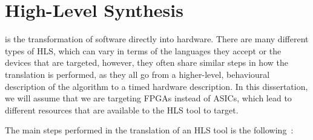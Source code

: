 \section{High-Level Synthesis}%
\label{sec:bg:hls}

 is the transformation of software directly into hardware.
There are many different types of \gls{HLS}, which can vary in terms of the
languages they accept or the devices that are targeted, however, they often
share similar steps in how the translation is performed, as they all go from a
higher-level, behavioural description of the algorithm to a timed hardware
description.  In this dissertation, we will assume that we are targeting
\glspl{FPGA} instead of \glspl{ASIC}, which lead to different resources that are
available to the \gls{HLS} tool to target.

The main steps performed in the translation of an \gls{HLS} tool is the
following~\cite{coussy09_introd_to_high_level_synth,canis13_legup}:

